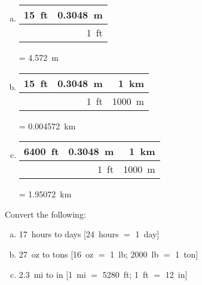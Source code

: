 \documentclass[11pt,letterpaper]{article}
\begin{document}
\sol
\begin{enumerate}[(a)]
\item \phantom{.} \par
	\begin{table}[!ht]
	\centering
	\begin{tabular}{r|r}
	15~ft & 0.3048~m \\ \hline
		 & 1~ft  
	\end{tabular}
	= 4.572~m
	\end{table}
 
\item \phantom{.} \par
	\begin{table}[!ht]
	\centering
	\begin{tabular}{r|r|r}
	15~ft & 0.3048~m & 1~km \\ \hline
		& 1~ft 	   & 1000~m
	\end{tabular}
	= 0.004572~km
	\end{table} 

\item \phantom{.} \par
	\begin{table}[!ht]
	\centering
	\begin{tabular}{r|r|r}
	6400~ft & 0.3048~m & 1~km \\ \hline
		     & 1~ft 	     & 1000~m
	\end{tabular}
	= 1.95072~km
	\end{table} 
\end{enumerate}



\newpage



 Convert the following:
\begin{enumerate}[(a)]
\item 17~hours to days [24~hours $=$ 1~day]
\item 27~oz to tons [16~oz $=$ 1~lb; 2000~lb $=$ 1~ton]
\item 2.3~mi to in [1~mi $=$ 5280~ft; 1~ft $=$ 12~in]
\end{enumerate} \pspace
\end{document}
